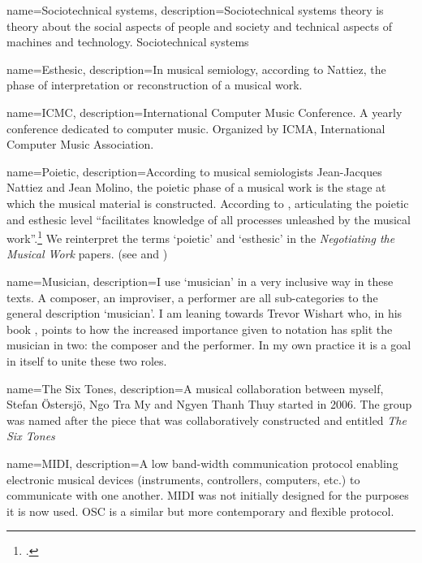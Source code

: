{name={Sociotechnical systems},
  description={Sociotechnical systems theory is theory about the social aspects of people and society and technical aspects of machines and technology.} Sociotechnical systems}

{name={Esthesic},
  description={In musical semiology, according to Nattiez, the phase of interpretation or reconstruction of a musical work.}}

{name={ICMC},
  description={International Computer Music Conference. A yearly conference dedicated to computer music. Organized by ICMA, International Computer Music Association.}}

{name={Poietic},
  description={According to musical semiologists Jean-Jacques
  Nattiez and Jean Molino, the poietic phase of a musical work is the
  stage at which the musical material is constructed. According to
  \citeauthor{nattiez}, articulating the poietic and esthesic level
  ``facilitates knowledge of all processes unleashed by the musical
  work''.\footcite[92]{nattiez} We reinterpret the terms `poietic'
  and `esthesic' in the \emph{Negotiating the Musical Work} papers. (see \cite{frisk-ost06} and \cite{frisk-ost06-2})}}

{name={Musician},
  description={I use `musician' in a very inclusive
  way in these texts. A composer, an improviser, a performer are all
  sub-categories to the general description `musician'. I am leaning towards Trevor Wishart who, in his book , points to how the increased importance given to notation has split the musician in two: the composer and the performer. In my own practice it is a goal in itself to unite these two roles.}}

{name={The Six Tones},
  description={A musical collaboration between myself, Stefan \"{O}stersj\"{o}, Ngo Tra My and Ngyen Thanh Thuy started in 2006. The group was named after the piece that was collaboratively constructed and entitled \emph{The Six Tones}}}

{name={MIDI},
  description={A low band-width communication protocol enabling electronic musical devices (instruments, controllers, computers, etc.) to communicate with one another. MIDI was not initially designed for the purposes it is now used. OSC is a similar but more contemporary and flexible protocol.}}

